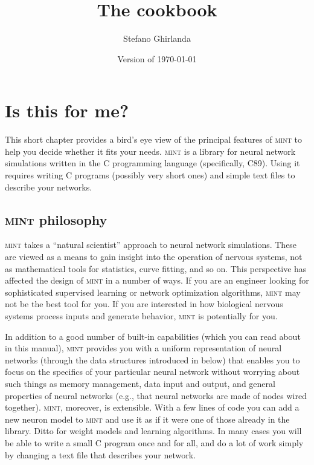 \documentclass[12pt,letterpaper]{memoir}
\title{\bfseries The \mint cookbook}
\author{Stefano Ghirlanda}
\date{\footnotesize Version \mintversion of \today}
\let\fref\relax%
\newcommand{\mint}{{\scshape\sffamily mint}\xspace}
\begin{document}
\pagestyle{plain}

\maketitle

\renewcommand{\printtoctitle}[1]{%
  \large\bfseries\contentsname}
\renewcommand{\cftsectionfont}{}
\renewcommand{\cftsectionpagefont}{}
\renewcommand{\cftchapterfont}{}
\renewcommand{\cftchapterpagefont}{}
\tableofcontents*

\renewcommand{\foottextfont}{\sffamily\footnotesize}

\renewcommand{\thepage}{\sffamily\arabic{page}}

\clearpage

\chapter{Is this for me?}
\label{chap:intro}

This short chapter provides a bird's eye view of the principal
features of \mint to help you decide whether it fits your needs.
\mint is a library for neural network simulations written in the C
programming language (specifically, C89). Using it requires writing C
programs (possibly very short ones) and simple text files to describe
your networks.

\section{\mint philosophy}
\label{sec:mint-philosophy}

\mint takes a ``natural scientist'' approach to neural network
simulations. These are viewed as a means to gain insight into the
operation of nervous systems, not as mathematical tools for
statistics, curve fitting, and so on. This perspective has affected
the design of \mint in a number of ways. If you are an engineer
looking for sophisticated supervised learning or network optimization
algorithms, \mint may not be the best tool for you.  If you are
interested in how biological nervous systems process inputs and
generate behavior, \mint is potentially for you.

In addition to a good number of built-in capabilities (which you can
read about in this manual), \mint provides you with a uniform
representation of neural networks (through the data structures
introduced in \fref{sec:the-very-basics} below) that enables you to
focus on the specifics of your particular neural network without
worrying about such things as memory management, data input and
output, and general properties of neural networks (e.g., that neural
networks are made of nodes wired together).  \mint, moreover, is
extensible.  With a few lines of code you can add a new neuron model
to \mint and use it as if it were one of those already in the
library. Ditto for weight models and learning algorithms. In many
cases you will be able to write a small C program once and for all,
and do a lot of work simply by changing a text file that describes
your network.
\end{document}
